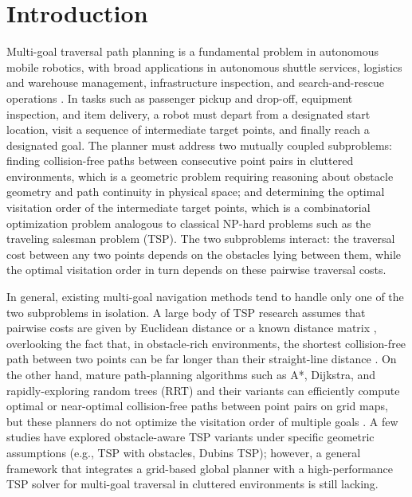 \documentclass[pdflatex,sn-basic,Numbered]{sn-jnl}
\begin{document}

\maketitle


\section{Introduction}

Multi-goal traversal path planning is a fundamental problem in autonomous mobile robotics, with broad applications in autonomous shuttle services, logistics and warehouse management, infrastructure inspection, and search-and-rescue operations \cite{ref1,ref2,ref33,ref37,ref38}. In tasks such as passenger pickup and drop-off, equipment inspection, and item delivery, a robot must depart from a designated start location, visit a sequence of intermediate target points, and finally reach a designated goal. The planner must address two mutually coupled subproblems: finding collision-free paths between consecutive point pairs in cluttered environments, which is a geometric problem requiring reasoning about obstacle geometry and path continuity in physical space; and determining the optimal visitation order of the intermediate target points, which is a combinatorial optimization problem analogous to classical NP-hard problems such as the traveling salesman problem (TSP). The two subproblems interact: the traversal cost between any two points depends on the obstacles lying between them, while the optimal visitation order in turn depends on these pairwise traversal costs.

In general, existing multi-goal navigation methods tend to handle only one of the two subproblems in isolation. A large body of TSP research assumes that pairwise costs are given by Euclidean distance or a known distance matrix \cite{ref4,ref36}, overlooking the fact that, in obstacle-rich environments, the shortest collision-free path between two points can be far longer than their straight-line distance \cite{ref39}. On the other hand, mature path-planning algorithms such as A*, Dijkstra, and rapidly-exploring random trees (RRT) and their variants can efficiently compute optimal or near-optimal collision-free paths between point pairs on grid maps, but these planners do not optimize the visitation order of multiple goals \cite{ref5,ref6,ref7}. A few studies have explored obstacle-aware TSP variants under specific geometric assumptions (e.g., TSP with obstacles, Dubins TSP); however, a general framework that integrates a grid-based global planner with a high-performance TSP solver for multi-goal traversal in cluttered environments is still lacking.
\end{document}
